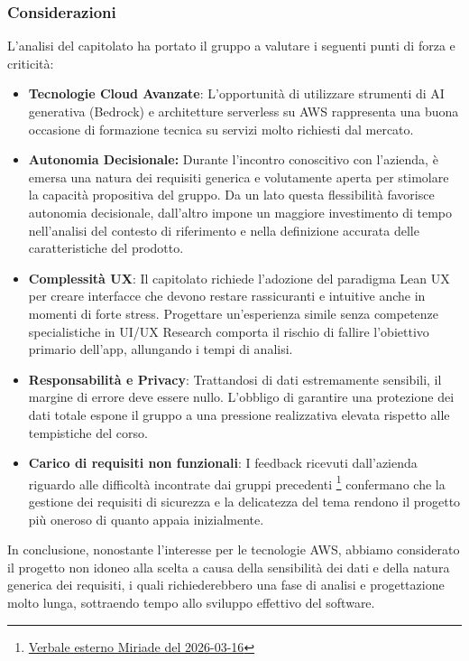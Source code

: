 \documentclass[a4paper, 10pt, colorlinks=true, linkcolor=black, urlcolor=blue, citecolor=blue, hidelinks]{article}
\begin{document}
\begin{itemize}
\subsubsection{Considerazioni}
L'analisi del capitolato ha portato il gruppo a valutare i seguenti punti di forza e criticità:
\begin{itemize}
    \item \textbf{Tecnologie Cloud Avanzate}: L'opportunità di utilizzare strumenti di AI generativa (Bedrock) e architetture serverless su AWS rappresenta una buona occasione di formazione tecnica su servizi molto richiesti dal mercato.
    \item \textbf{Autonomia Decisionale:} Durante l'incontro conoscitivo con l'azienda, è emersa una natura dei requisiti generica e volutamente aperta per stimolare la capacità propositiva del gruppo. Da un lato questa flessibilità favorisce autonomia decisionale, dall'altro impone un maggiore investimento di tempo nell’analisi del contesto di riferimento e nella definizione accurata delle caratteristiche del prodotto.
    \item \textbf{Complessità UX}: Il capitolato richiede l'adozione del paradigma Lean UX per creare interfacce che devono restare rassicuranti e intuitive anche in momenti di forte stress. Progettare un'esperienza simile senza competenze specialistiche in UI/UX Research comporta il rischio di fallire l'obiettivo primario dell'app, allungando i tempi di analisi.
    \item \textbf{Responsabilità e Privacy}: Trattandosi di dati estremamente sensibili, il margine di errore deve essere nullo. L'obbligo di garantire una protezione dei dati totale espone il gruppo a una pressione realizzativa elevata rispetto alle tempistiche del corso.
    \item \textbf{Carico di requisiti non funzionali}: I feedback ricevuti dall'azienda riguardo alle difficoltà incontrate dai gruppi precedenti \footnote{\href{https://github.com/thebitless-group-swe/thebitless.github.io/blob/main/candidatura/verbali/verbali_esterni/VE_2026-03-16_Miriade/VE_2026-03-16_Miriade.pdf}{Verbale esterno Miriade del 2026-03-16}} confermano che la gestione dei requisiti di sicurezza e la delicatezza del tema rendono il progetto più oneroso di quanto appaia inizialmente.
\end{itemize}

In conclusione, nonostante l'interesse per le tecnologie AWS, abbiamo considerato il progetto non idoneo alla scelta a causa della sensibilità dei dati e della natura generica dei requisiti, i quali richiederebbero una fase di analisi e progettazione molto lunga, sottraendo tempo allo sviluppo effettivo del software.


\end{itemize}
\end{document}
